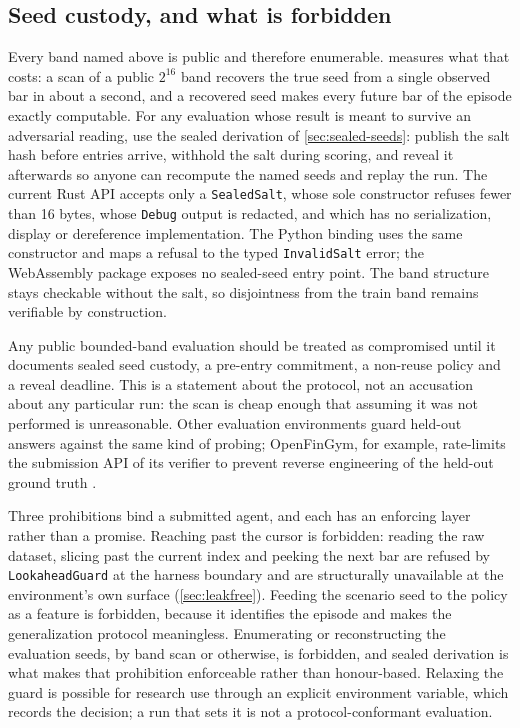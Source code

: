 \subsection{Seed custody, and what is forbidden}\label{sec:protocol-custody}

Every band named above is public and therefore enumerable.  measures what that costs: a scan of a public $2^{16}$ band recovers the true seed from a single observed bar in about a second, and a recovered seed makes every future bar of the episode exactly computable. For any evaluation whose result is meant to survive an adversarial reading, use the sealed derivation of \cref{sec:sealed-seeds}: publish the salt hash before entries arrive, withhold the salt during scoring, and reveal it afterwards so anyone can recompute the named seeds and replay the run. The current Rust API accepts only a \texttt{SealedSalt}, whose sole constructor refuses fewer than 16 bytes, whose \texttt{Debug} output is redacted, and which has no serialization, display or dereference implementation. The Python binding uses the same constructor and maps a refusal to the typed \texttt{InvalidSalt} error; the WebAssembly package exposes no sealed-seed entry point. The band structure stays checkable without the salt, so disjointness from the train band remains verifiable by construction.

Any public bounded-band evaluation should be treated as compromised until it documents sealed seed custody, a pre-entry commitment, a non-reuse policy and a reveal deadline. This is a statement about the protocol, not an accusation about any particular run: the scan is cheap enough that assuming it was not performed is unreasonable. Other evaluation environments guard held-out answers against the same kind of probing; OpenFinGym, for example, rate-limits the submission API of its verifier to prevent reverse engineering of the held-out ground truth \citep[p.~7]{zhang2026openfingym}.

Three prohibitions bind a submitted agent, and each has an enforcing layer rather than a promise. Reaching past the cursor is forbidden: reading the raw dataset, slicing past the current index and peeking the next bar are refused by \texttt{LookaheadGuard} at the harness boundary and are structurally unavailable at the environment's own surface (\cref{sec:leakfree}). Feeding the scenario seed to the policy as a feature is forbidden, because it identifies the episode and makes the generalization protocol meaningless. Enumerating or reconstructing the evaluation seeds, by band scan or otherwise, is forbidden, and sealed derivation is what makes that prohibition enforceable rather than honour-based. Relaxing the guard is possible for research use through an explicit environment variable, which records the decision; a run that sets it is not a protocol-conformant evaluation.

